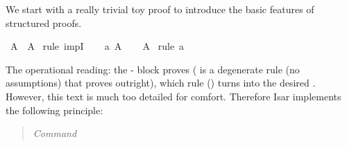 %
\begin{isabellebody}%
\def\isabellecontext{Logic}%
%
\isadelimtheory
%
\endisadelimtheory
%
\isatagtheory
%
\endisatagtheory
{\isafoldtheory}%
%
\isadelimtheory
%
\endisadelimtheory
%
\isamarkuptrue%
%
\isamarkuptrue%
%
\isamarkuptrue%
%
\begin{isamarkuptext}%
We start with a really trivial toy proof to introduce the basic
features of structured proofs.%
\end{isamarkuptext}%
\isamarkuptrue%
\isamarkupfalse%
\ {}A\ {}\ A{}\isanewline
%
\isadelimproof
%
\endisadelimproof
%
\isatagproof
{}\isamarkupfalse%
\ {}rule\ impI{}\isanewline
\ \ \isamarkupfalse%
\ a{}\ {}A{}\isanewline
\ \ \isamarkupfalse%
\ {}A{}\ \isamarkupfalse%
{}rule\ a{}\isanewline
{}\isamarkupfalse%
%
\endisatagproof
{\isafoldproof}%
%
\isadelimproof
%
\endisadelimproof
%
\begin{isamarkuptext}%
\noindent
The operational reading: the -
block proves  ( is a degenerate rule (no
assumptions) that proves  outright), which rule
 () turns into the desired .  However, this text is much too detailed for comfort. Therefore
Isar implements the following principle: \begin{quote}\em Command

\end{quote}
\end{isamarkuptext}
\end{isabellebody}
